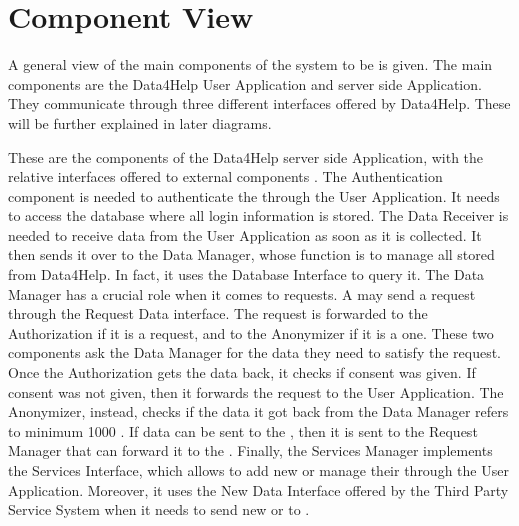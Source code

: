 \documentclass[../../DD.tex]{subfiles}
\begin{document}
\section{Component View}


	A general view of the main components of the system to be is given. The main components are the Data4Help User Application and server side Application. They communicate through three different interfaces offered by Data4Help. These will be further explained in later diagrams. 


	These are the components of the Data4Help server side Application, with the relative interfaces offered to external components .
	The Authentication component is needed to authenticate the  through the User Application. It needs to access the database where all login information is stored. The Data Receiver is needed to receive data from the User Application as soon as it is collected. It then sends it over to the Data Manager, whose function is to manage all  stored from Data4Help. In fact, it uses the Database Interface to query it.
	The Data Manager has a crucial role when it comes to  requests. A  may send a request through the Request Data interface. The request is forwarded to the Authorization if it is a  request, and to the Anonymizer if it is a  one. These two components ask the Data Manager for the data they need to satisfy the request. Once the Authorization gets the data back, it checks if  consent was given. If consent was not given, then it forwards the request to the User Application. The Anonymizer, instead, checks if the data it got back from the Data Manager refers to minimum 1000 . If data can be sent to the , then it is sent to the Request Manager that can forward it to the  .
	Finally, the Services Manager implements the Services Interface, which allows  to add new or manage their  through the User Application. Moreover, it uses the New Data Interface offered by the Third Party Service System when it needs to send new  or  to .
\end{document}
